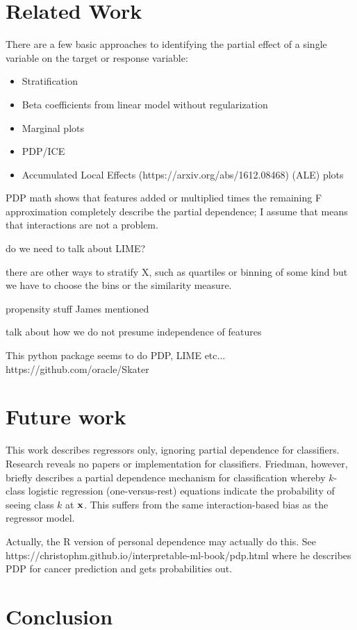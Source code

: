 \documentclass[12pt]{article}
\begin{document}
\section{Related Work}

There are a few basic approaches to identifying the partial effect of a single variable on the target or response variable:

\begin{itemize}
\item Stratification
\item Beta coefficients from linear model without regularization
\item Marginal plots
\item PDP/ICE
\item Accumulated Local Effects (https://arxiv.org/abs/1612.08468) (ALE) plots
\end{itemize}

PDP math shows that features added or multiplied times the remaining F approximation completely describe the partial dependence; I assume that means that interactions are not a problem.

do we need to talk about LIME?

there are other ways to stratify X, such as quartiles or binning of some kind but we have to choose the bins or the similarity measure.

propensity stuff James mentioned

talk about how we do not presume independence of features
 
This python package seems to do PDP, LIME etc... https://github.com/oracle/Skater

\section{Future work}

This work describes regressors only, ignoring partial dependence for classifiers.  Research reveals no papers or implementation for classifiers. Friedman, however, briefly describes a partial dependence mechanism for classification whereby $k$-class logistic regression (one-versus-rest) equations indicate the probability of seeing class $k$ at $\bf{x}$.  This suffers from the same interaction-based bias as the regressor model.

Actually, the R version of personal dependence may actually do this. See https://christophm.github.io/interpretable-ml-book/pdp.html where he describes PDP for cancer prediction and gets probabilities out.

\section{Conclusion}
\label{sec:conc}




\end{document}
